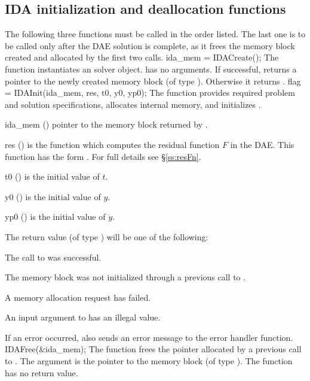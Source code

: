 \subsection{IDA initialization and deallocation functions}
\label{sss:idainit}
The following three functions must be called in the order listed. The last one
is to be called only after the DAE solution is complete, as it frees the {\ida}
memory block created and allocated by the first two calls.
{
  ida\_mem = IDACreate();
}
{
  The function  instantiates an {\ida} solver object.
}
{
   has no arguments.
}
{
  If successful,  returns a pointer to the newly created
  {\ida} memory block (of type ).  Otherwise it returns .
}
{}
{
  flag = IDAInit(ida\_mem, res, t0, y0, yp0);
}
{
  The function  provides required problem and solution
  specifications, allocates internal memory, and initializes {\ida}.
}
{
  \begin{args}
  \item[ida\_mem] ()
    pointer to the {\ida} memory block returned by .
  \item[res] ()
    is the {\CC} function which computes the residual function $F$ in the DAE.
     This function has the form .
     For full details see \S\ref{ss:resFn}.
  \item[t0] ()
    is the initial value of $t$.
  \item[y0] ()
    is the initial value of $y$.
  \item[yp0] ()
    is the initial value of $\dot{y}$.
  \end{args}
}
{
  The return value  (of type ) will be one of the following:
  \begin{args}
  \item[\Id{IDA\_SUCCESS}]
    The call to  was successful.
  \item[\Id{IDA\_MEM\_NULL}]
    The {\ida} memory block was not initialized through a previous call to
    .
  \item[\Id{IDA\_MEM\_FAIL}]
    A memory allocation request has failed.
  \item[\Id{IDA\_ILL\_INPUT}]
    An input argument to  has an illegal value.
  \end{args}
}
{
  If an error occurred,  also sends an error message to the
  error handler function.
}
{
  IDAFree(\&ida\_mem);
}
{
  The function  frees the pointer allocated by
  a previous call to .
}
{
  The argument is the pointer to the {\ida} memory block (of type ).
}
{
  The function  has no return value.
}
{}


